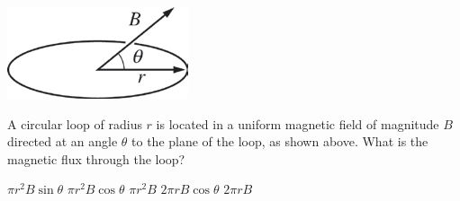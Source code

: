 \begin{center}
\includegraphics[scale=0.5]{images/img-003-005.png}
\end{center}

\begin{questions}\setcounter{question}{5}\question
A circular loop of radius $r$ is located in a uniform magnetic field of magnitude $B$ directed at an angle $\theta$ to the plane of the loop, as shown above. What is the magnetic flux through the loop?

\begin{oneparchoices}
\choice $\pi r^{2} B \sin \theta$
\choice $\pi r^{2} B \cos \theta$
\choice $\pi r^{2} B$
\choice $2 \pi r B \cos \theta$
\choice $2 \pi r B$
\end{oneparchoices}\end{questions}

